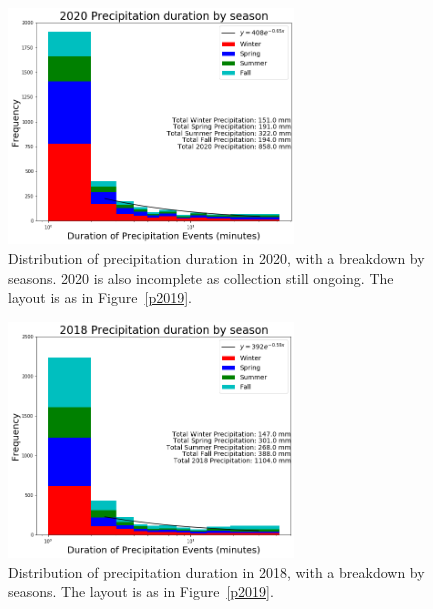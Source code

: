 \documentclass[11pt]{report}
\begin{document}
\begin{figure}[b]
  \centering
  \includegraphics[width=0.675\textwidth]{Figures/precip_2020.png}
  \caption[Precipitation histogram for 2020 broken down by
    season]{\label{p2020} Distribution of precipitation duration
    in 2020, with a breakdown by seasons. 2020 is also
    incomplete as collection still ongoing. The layout is as in
    Figure~\ref{p2019}.}
\end{figure}
\clearpage
\begin{figure}[t]
  \centering
  \includegraphics[width=0.675\textwidth]{Figures/precip_2018.png}
  \caption[Precipitation histogram for 2018 broken down by season]{\label{p2018}
    Distribution of precipitation duration in 2018, with a breakdown
    by seasons. The layout is as in Figure~\ref{p2019}.}
\end{figure}
\end{document}
